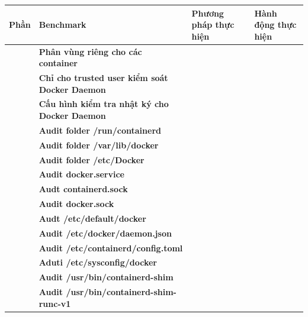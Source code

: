 {\def\LTcaptype{none} %
\begin{longtable}[]{@{}|
  >{\raggedright\arraybackslash}p{}|
  >{\raggedright\arraybackslash}p{}|
  >{\raggedright\arraybackslash}p{}|
  >{\raggedright\arraybackslash}p{}|@{}}
\hline
\begin{minipage}[b]{\linewidth}\raggedright
\textbf{Phần}
\end{minipage} & \begin{minipage}[b]{\linewidth}\raggedright
\textbf{Benchmark}
\end{minipage} & \begin{minipage}[b]{\linewidth}\raggedright
\textbf{Phương pháp thực hiện}
\end{minipage} & \begin{minipage}[b]{\linewidth}\raggedright
\textbf{Hành động thực hiện}
\end{minipage} \\
\hline
\endhead
\endlastfoot
\multirow{19}{=}{\textbf{1}} & \textbf{Phân vùng riêng cho các container} & & \\
\hline
& \textbf{Chỉ cho trusted user kiểm soát Docker Daemon} & & \\
\hline
& \textbf{Cấu hình kiểm tra nhật ký cho Docker Daemon} & & \\
\hline
& \textbf{Audit folder /run/containerd} & & \\
\hline
& \textbf{Audit folder /var/lib/docker} & & \\
\hline
& \textbf{Audit folder /etc/Docker} & & \\
\hline
& \textbf{Audit docker.service} & & \\
\hline
& \textbf{Audt containerd.sock} & & \\
\hline
& \textbf{Audit docker.sock} & & \\
\hline
& \textbf{Audt /etc/default/docker} & & \\
\hline
& \textbf{Audit /etc/docker/daemon.json} & & \\
\hline
& \textbf{Audit /etc/containerd/config.toml} & & \\
\hline
& \textbf{Aduti /etc/sysconfig/docker} & & \\
\hline
& \textbf{Audit /usr/bin/containerd-shim} & & \\
\hline
& \textbf{Audit /usr/bin/containerd-shim-runc-v1} & & \\

\end{longtable}}
